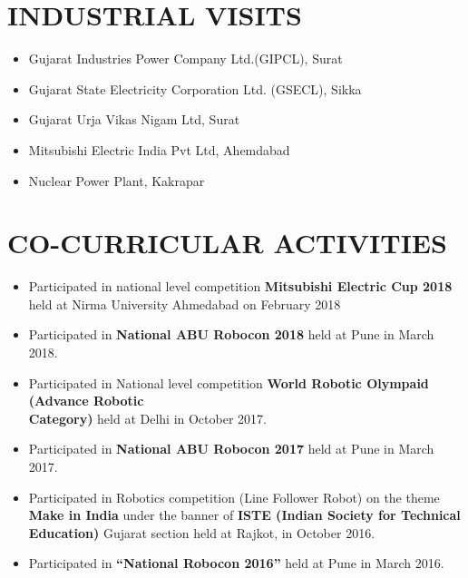 \documentclass{res}
\begin{document}
\begin{resume}
\section {INDUSTRIAL VISITS}
\begin{itemize}  \itemsep -2pt  %
\item Gujarat Industries Power Company Ltd.(GIPCL), Surat
\item Gujarat State Electricity Corporation Ltd. (GSECL), Sikka
\item Gujarat Urja Vikas Nigam Ltd, Surat
\item Mitsubishi Electric India Pvt Ltd, Ahemdabad
\item Nuclear  Power  Plant, Kakrapar   
\end{itemize}
 

\section{CO-CURRICULAR ACTIVITIES}          
\begin{itemize} \itemsep -2pt  %
\item Participated in national level competition \textbf {Mitsubishi Electric Cup 2018} held at Nirma University Ahmedabad on February 2018 
\item Participated in \textbf {National ABU Robocon 2018} held at Pune in March 2018.
\item Participated  in National level competition \textbf {World Robotic Olympaid (Advance Robotic \\Category)} held at Delhi in October 2017.
\item Participated in \textbf {National ABU Robocon 2017} held at Pune in March 2017.
\item  Participated in Robotics competition (Line Follower Robot) on the theme \textbf {Make in India} under the banner of \textbf {ISTE (Indian Society for Technical Education)} Gujarat section held at Rajkot, in October 2016.   
\item  Participated in \textbf {“National Robocon 2016”} held at Pune in March 2016.


\end{itemize}
\end{resume}
\end{document}
